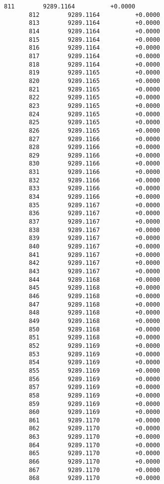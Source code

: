 \documentclass[11pt]{article}
\begin{document}
\begin{Verbatim}[commandchars=\\\{\}]
       811        9289.1164          +0.0000
       812        9289.1164          +0.0000
       813        9289.1164          +0.0000
       814        9289.1164          +0.0000
       815        9289.1164          +0.0000
       816        9289.1164          +0.0000
       817        9289.1164          +0.0000
       818        9289.1164          +0.0000
       819        9289.1165          +0.0000
       820        9289.1165          +0.0000
       821        9289.1165          +0.0000
       822        9289.1165          +0.0000
       823        9289.1165          +0.0000
       824        9289.1165          +0.0000
       825        9289.1165          +0.0000
       826        9289.1165          +0.0000
       827        9289.1166          +0.0000
       828        9289.1166          +0.0000
       829        9289.1166          +0.0000
       830        9289.1166          +0.0000
       831        9289.1166          +0.0000
       832        9289.1166          +0.0000
       833        9289.1166          +0.0000
       834        9289.1166          +0.0000
       835        9289.1167          +0.0000
       836        9289.1167          +0.0000
       837        9289.1167          +0.0000
       838        9289.1167          +0.0000
       839        9289.1167          +0.0000
       840        9289.1167          +0.0000
       841        9289.1167          +0.0000
       842        9289.1167          +0.0000
       843        9289.1167          +0.0000
       844        9289.1168          +0.0000
       845        9289.1168          +0.0000
       846        9289.1168          +0.0000
       847        9289.1168          +0.0000
       848        9289.1168          +0.0000
       849        9289.1168          +0.0000
       850        9289.1168          +0.0000
       851        9289.1168          +0.0000
       852        9289.1169          +0.0000
       853        9289.1169          +0.0000
       854        9289.1169          +0.0000
       855        9289.1169          +0.0000
       856        9289.1169          +0.0000
       857        9289.1169          +0.0000
       858        9289.1169          +0.0000
       859        9289.1169          +0.0000
       860        9289.1169          +0.0000
       861        9289.1170          +0.0000
       862        9289.1170          +0.0000
       863        9289.1170          +0.0000
       864        9289.1170          +0.0000
       865        9289.1170          +0.0000
       866        9289.1170          +0.0000
       867        9289.1170          +0.0000
       868        9289.1170          +0.0000

\end{Verbatim}
\end{document}
